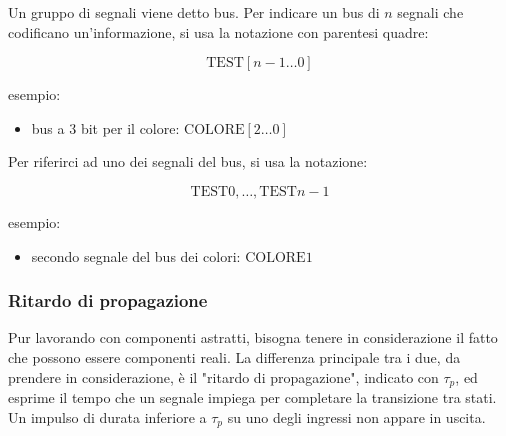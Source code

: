 \documentclass{subfiles}
\begin{document}
Un gruppo di segnali viene detto bus.
Per indicare un bus di $n$ segnali che codificano un'informazione, si usa la notazione con parentesi quadre:

$$
\text{TEST}[n-1 \dots 0]
$$

\noindent
esempio:

\begin{itemize}
	\item bus a $3$ bit per il colore: $\text{COLORE}[2 \dots 0]$
\end{itemize}

\noindent
Per riferirci ad uno dei segnali del bus, si usa la notazione:

$$
\text{TEST}0, \dots, \text{TEST}n-1
$$

\noindent
esempio:

\begin{itemize}
	\item secondo segnale del bus dei colori: $\text{COLORE}1$
\end{itemize}

\subsubsection{Ritardo di propagazione}

Pur lavorando con componenti astratti, bisogna tenere in considerazione il fatto che possono essere componenti reali.
La differenza principale tra i due, da prendere in considerazione, è il "ritardo di propagazione", indicato con $\tau_p$, ed esprime il tempo che un segnale impiega per completare la transizione tra stati.
Un impulso di durata inferiore a $\tau_p$ su uno degli ingressi non appare in uscita.
\end{document}
